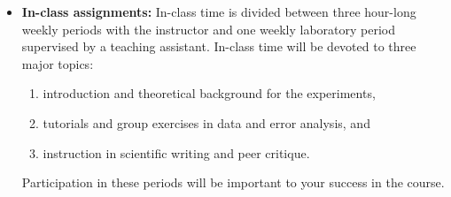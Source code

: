 \documentclass{revtex4}
\begin{document}
\begin{itemize}

\item
{\bf In-class assignments:} In-class time is divided between three hour-long
weekly periods with the instructor and one weekly laboratory period supervised
by a teaching assistant. In-class time will be devoted to three major topics:
\begin{enumerate}
\item
introduction and theoretical background for the experiments,
\item
tutorials and group exercises in data and error analysis, and
\item
instruction in scientific writing and peer critique.
\end{enumerate}
Participation in these periods will be important to your success in the course.


\end{itemize}
\end{document}
